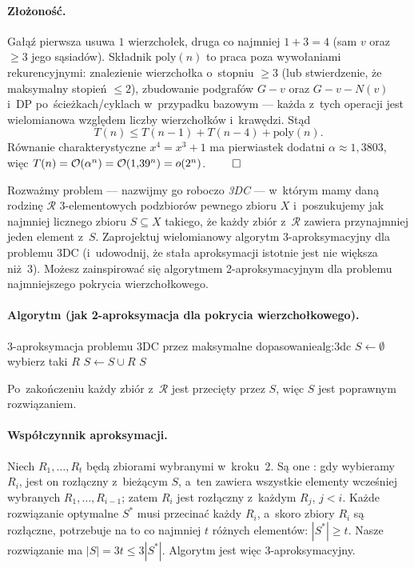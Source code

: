 \paragraph{Złożoność.}
Gałąź pierwsza usuwa $1$ wierzchołek, druga co najmniej $1+3=4$ (sam $v$ oraz
$\ge 3$ jego sąsiadów). Składnik $\mathrm{poly}(n)$ to praca poza wywołaniami
rekurencyjnymi: znalezienie wierzchołka o~stopniu $\ge 3$ (lub stwierdzenie, że
maksymalny stopień $\le 2$), zbudowanie podgrafów $G-v$ oraz $G-v-N(v)$ i~DP
po~ścieżkach/cyklach w~przypadku bazowym --- każda z~tych operacji jest
wielomianowa względem liczby wierzchołków i~krawędzi. Stąd
\[
	T(n)\le T(n-1)+T(n-4)+\mathrm{poly}(n).
\]
Równanie charakterystyczne $x^4=x^3+1$ ma pierwiastek dodatni
$\alpha\approx 1{,}3803$, więc $T(n)=\mathcal{O}(\alpha^n)=\mathcal{O}(1{,}39^n)=o(2^n)$. $\qed$

\clearpage
\begin{zadanie}
	Rozważmy problem --- nazwijmy go roboczo \emph{3DC} --- w~którym mamy daną
	rodzinę $\mathcal{R}$ 3-elementowych podzbiorów pewnego zbioru $X$
	i~poszukujemy jak najmniej licznego zbioru $S\subseteq X$ takiego, że każdy
	zbiór z~$\mathcal{R}$ zawiera przynajmniej jeden element z~$S$. Zaprojektuj
	wielomianowy algorytm 3-aproksymacyjny dla problemu 3DC (i~udowodnij, że stała
	aproksymacji istotnie jest nie większa niż~3). Możesz zainspirować się
	algorytmem 2-aproksymacyjnym dla problemu najmniejszego pokrycia
	wierzchołkowego.
\end{zadanie}

\paragraph{Algorytm (jak 2-aproksymacja dla pokrycia wierzchołkowego).}
\begin{alg}{3-aproksymacja problemu 3DC przez maksymalne dopasowanie}{alg:3dc}
	\State $S\gets\emptyset$
	\State wybierz taki $R$
	\State $S\gets S\cup R$
	\EndWhile
	\State \Return $S$
	\EndFunction
\end{alg}
Po~zakończeniu każdy zbiór z~$\mathcal{R}$ jest przecięty przez $S$, więc $S$ jest
poprawnym rozwiązaniem.

\paragraph{Współczynnik aproksymacji.}
Niech $R_1,\dots,R_t$ będą zbiorami wybranymi w~kroku~2. Są one
: gdy wybieramy $R_i$, jest on rozłączny z~bieżącym $S$,
a~ten zawiera wszystkie elementy wcześniej wybranych $R_1,\dots,R_{i-1}$; zatem
$R_i$ jest rozłączny z~każdym $R_j$, $j<i$. Każde rozwiązanie optymalne $S^\ast$
musi przecinać każdy $R_i$, a~skoro zbiory $R_i$ są rozłączne, potrzebuje na to
co najmniej $t$ różnych elementów: $|S^\ast|\ge t$. Nasze rozwiązanie ma
$|S|=3t\le 3|S^\ast|$. Algorytm jest więc $3$-aproksymacyjny.

